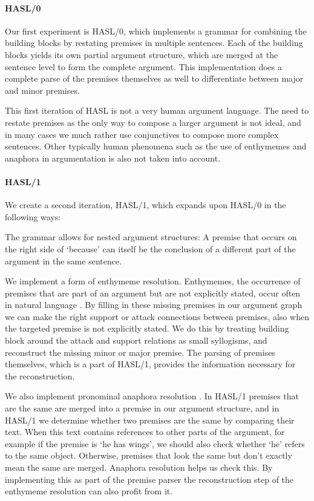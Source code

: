 \documentclass{IOS-Book-Article}
\begin{document}
\paragraph{HASL/0}
Our first experiment is HASL/0, which implements a grammar for combining the building blocks by restating premises in multiple sentences. Each of the building blocks yields its own partial argument structure, which are merged at the sentence level to form the complete argument. This implementation does a complete parse of the premises themselves as well to differentiate between major and minor premises.

This first iteration of HASL is not a very human argument language. The need to restate premises as the only way to compose a larger argument is not ideal, and in many cases we much rather use conjunctives to compose more complex sentences. Other typically human phenomena such as the use of enthymemes and anaphora in argumentation is also not taken into account.

\paragraph{HASL/1}
We create a second iteration, HASL/1, which expands upon HASL/0 in the following ways:

The grammar allows for nested argument structures: A premise that occurs on the right side of `because' can itself be the conclusion of a different part of the argument in the same sentence.

We implement a form of enthymeme resolution. Enthymemes, the occurrence of premises that are part of an argument but are not explicitly stated, occur often in natural language \cite{walton2005,reedRowe2004}. By filling in these missing premises in our argument graph we can make the right support or attack connections between premises, also when the targeted premise is not explicitly stated. We do this by treating building block around the attack and support relations as small syllogisms, and reconstruct the missing minor or major premise. The parsing of premises themselves, which is a part of HASL/1, provides the information necessary for the reconstruction.

We also implement pronominal anaphora resolution \cite{hobbs1978}. In HASL/1 premises that are the same are merged into a premise in our argument structure, and in HASL/1 we determine whether two premises are the same by comparing their text. When this text contains references to other parts of the argument, for example if the premise is `he has wings', we should also check whether `he' refers to the same object. Otherwise, premises that look the same but don't exactly mean the same are merged. Anaphora resolution helps us check this. By implementing this as part of the premise parser the reconstruction step of the enthymeme resolution can also profit from it.
\end{document}
